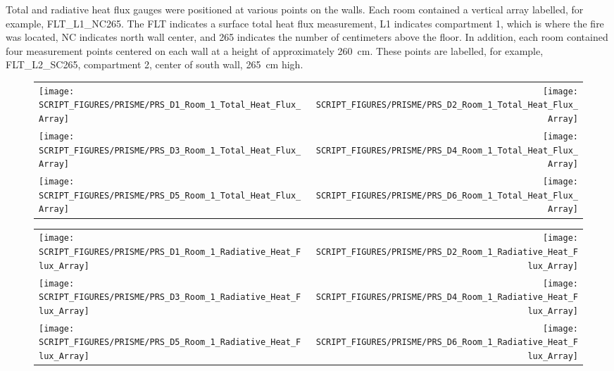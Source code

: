 \clearpage

Total and radiative heat flux gauges were positioned at various points on the walls. Each room contained a vertical array labelled, for example, FLT\_L1\_NC265. The FLT indicates a surface total heat flux measurement, L1 indicates compartment 1, which is where the fire was located, NC indicates north wall center, and 265 indicates the number of centimeters above the floor. In addition, each room contained four measurement points centered on each wall at a height of approximately 260~cm. These points are labelled, for example, FLT\_L2\_SC265, compartment 2, center of south wall, 265~cm high.

\begin{figure}[!ht]
\begin{tabular*}{\textwidth}{l@{\extracolsep{\fill}}r}
\texttt{[image: SCRIPT\_FIGURES/PRISME/PRS\_D1\_Room\_1\_Total\_Heat\_Flux\_Array]} &
\texttt{[image: SCRIPT\_FIGURES/PRISME/PRS\_D2\_Room\_1\_Total\_Heat\_Flux\_Array]} \\
\texttt{[image: SCRIPT\_FIGURES/PRISME/PRS\_D3\_Room\_1\_Total\_Heat\_Flux\_Array]} &
\texttt{[image: SCRIPT\_FIGURES/PRISME/PRS\_D4\_Room\_1\_Total\_Heat\_Flux\_Array]} \\
\texttt{[image: SCRIPT\_FIGURES/PRISME/PRS\_D5\_Room\_1\_Total\_Heat\_Flux\_Array]} &
\texttt{[image: SCRIPT\_FIGURES/PRISME/PRS\_D6\_Room\_1\_Total\_Heat\_Flux\_Array]}
\end{tabular*}
\label{PRISME_Wall_Array_THF_Room_1}
\end{figure}

\begin{figure}[p]
\begin{tabular*}{\textwidth}{l@{\extracolsep{\fill}}r}
\texttt{[image: SCRIPT\_FIGURES/PRISME/PRS\_D1\_Room\_1\_Radiative\_Heat\_Flux\_Array]} &
\texttt{[image: SCRIPT\_FIGURES/PRISME/PRS\_D2\_Room\_1\_Radiative\_Heat\_Flux\_Array]} \\
\texttt{[image: SCRIPT\_FIGURES/PRISME/PRS\_D3\_Room\_1\_Radiative\_Heat\_Flux\_Array]} &
\texttt{[image: SCRIPT\_FIGURES/PRISME/PRS\_D4\_Room\_1\_Radiative\_Heat\_Flux\_Array]} \\
\texttt{[image: SCRIPT\_FIGURES/PRISME/PRS\_D5\_Room\_1\_Radiative\_Heat\_Flux\_Array]} &
\texttt{[image: SCRIPT\_FIGURES/PRISME/PRS\_D6\_Room\_1\_Radiative\_Heat\_Flux\_Array]}
\end{tabular*}
\label{PRISME_Wall_Array_RHF_Room_1}
\end{figure}

